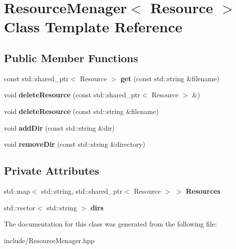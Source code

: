 \hypertarget{class_resource_menager}{}\section{Resource\+Menager$<$ Resource $>$ Class Template Reference}
\label{class_resource_menager}
\subsection*{Public Member Functions}
\begin{DoxyCompactItemize}
\item 
\mbox{\label{class_resource_menager_a1c75062d799f0baa37cfa4bbbc9a5779}} 
const std\+::shared\+\_\+ptr$<$ Resource $>$ {\bfseries get} (const std\+::string \&filename)
\item 
\mbox{\label{class_resource_menager_a4b5dd5677fcb6e948c23f9925d6a6418}} 
void {\bfseries delete\+Resource} (const std\+::shared\+\_\+ptr$<$ Resource $>$ \&)
\item 
\mbox{\label{class_resource_menager_a18a1e6c8e9ec427abefe13d44b84b2f2}} 
void {\bfseries delete\+Resource} (const std\+::string \&filename)
\item 
\mbox{\label{class_resource_menager_a0d170bac7d943759d3ccc608b6db7761}} 
void {\bfseries add\+Dir} (const std\+::string \&dir)
\item 
\mbox{\label{class_resource_menager_a795728420523e598b095abded51019b4}} 
void {\bfseries remove\+Dir} (const std\+::string \&directory)
\end{DoxyCompactItemize}
\subsection*{Private Attributes}
\begin{DoxyCompactItemize}
\item 
\mbox{\label{class_resource_menager_a20929ebb0198262129dd109e85f8dbd8}} 
std\+::map$<$ std\+::string, std\+::shared\+\_\+ptr$<$ Resource $>$ $>$ {\bfseries Resources}
\item 
\mbox{\label{class_resource_menager_aab54aad0286011ff600278b888e5a134}} 
std\+::vector$<$ std\+::string $>$ {\bfseries dirs}
\end{DoxyCompactItemize}


The documentation for this class was generated from the following file\+:\begin{DoxyCompactItemize}
\item 
include/Resource\+Menager.\+hpp\end{DoxyCompactItemize}
